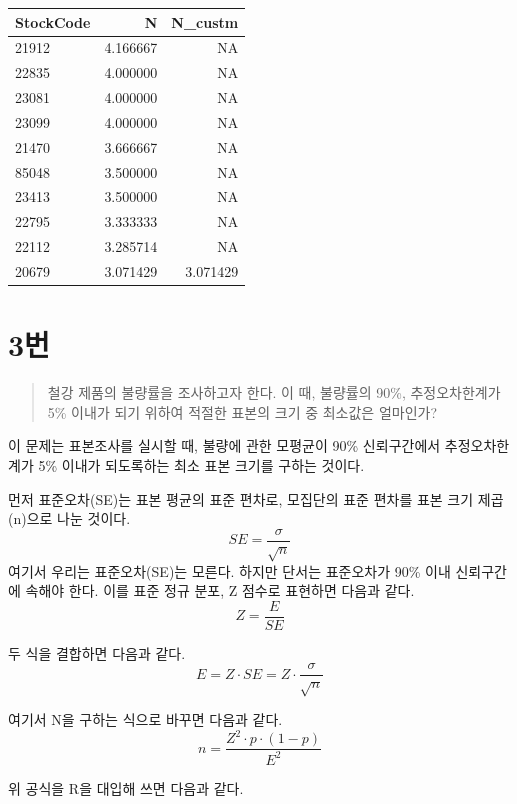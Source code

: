 \documentclass[
  letterpaper,
  DIV=11,
  numbers=noendperiod]{scrreprt}
\begin{document}
\begin{longtable}[]{@{}lrr@{}}
\toprule()
StockCode & N & N\_custm \\
\midrule()
\endhead
21912 & 4.166667 & NA \\
22835 & 4.000000 & NA \\
23081 & 4.000000 & NA \\
23099 & 4.000000 & NA \\
21470 & 3.666667 & NA \\
85048 & 3.500000 & NA \\
23413 & 3.500000 & NA \\
22795 & 3.333333 & NA \\
22112 & 3.285714 & NA \\
20679 & 3.071429 & 3.071429 \\
\bottomrule()
\end{longtable}

\hypertarget{uxbc88-25}{%
\chapter*{3번}\label{uxbc88-25}}


\begin{quote}
철강 제품의 불량률을 조사하고자 한다. 이 때, 불량률의 90\%,
추정오차한계가 5\% 이내가 되기 위하여 적절한 표본의 크기 중 최소값은
얼마인가?
\end{quote}

이 문제는 표본조사를 실시할 때, 불량에 관한 모평균이 90\% 신뢰구간에서
추정오차한계가 5\% 이내가 되도록하는 최소 표본 크기를 구하는 것이다.

먼저 표준오차(SE)는 표본 평균의 표준 편차로, 모집단의 표준 편차를 표본
크기 제곱(n)으로 나눈 것이다. \[SE = \frac{{\sigma}}{{\sqrt{n}}}\]
여기서 우리는 표준오차(SE)는 모른다. 하지만 단서는 표준오차가 90\% 이내
신뢰구간에 속해야 한다. 이를 표준 정규 분포, Z 점수로 표현하면 다음과
같다. \[Z = \frac{{E}}{{SE}}\]

두 식을 결합하면 다음과
같다.\[E = Z \cdot SE = Z \cdot \frac{{\sigma}}{{\sqrt{n}}}\]

여기서 N을 구하는 식으로 바꾸면 다음과 같다.
\[n = \frac{{Z^2 \cdot p \cdot (1-p)}}{{E^2}}\]

위 공식을 R을 대입해 쓰면 다음과 같다.
\end{document}
